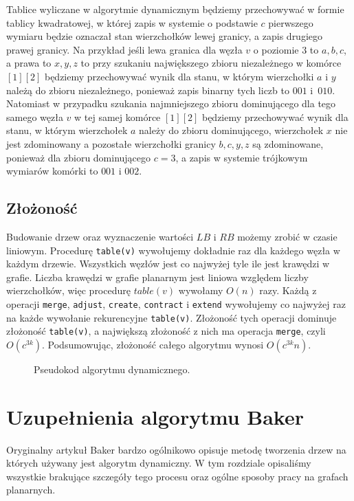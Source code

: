 \documentclass[twoside,a4paper,12pt]{report} %
\theoremstyle{break}
\begin{document}
Tablice wyliczane w algorytmie dynamicznym będziemy przechowywać w formie tablicy kwadratowej, w której zapis w systemie o podstawie $c$ pierwszego wymiaru będzie oznaczał stan wierzchołków lewej granicy, a zapis drugiego prawej granicy. Na przykład jeśli lewa granica dla węzła $v$ o poziomie $3$ to $a,b,c$, a prawa to $x,y,z$ to przy szukaniu największego zbioru niezależnego w komórce $[1][2]$ będziemy przechowywać wynik dla stanu, w którym wierzchołki $a$ i $y$ należą do zbioru niezależnego, ponieważ zapis binarny tych liczb to $001$ i~$010$. Natomiast w przypadku szukania najmniejszego zbioru dominującego dla tego samego węzła $v$ w tej samej komórce $[1][2]$ będziemy przechowywać wynik dla stanu, w którym wierzchołek $a$ należy do zbioru dominującego, wierzchołek $x$ nie jest zdominowany a pozostałe wierzchołki granicy $b,c,y,z$ są zdominowane, ponieważ dla zbioru dominującego $c=3$, a zapis w systemie trójkowym wymiarów komórki to $001$ i $002$.

\section{Złożoność}
Budowanie drzew oraz wyznaczenie wartości $LB$ i $RB$ możemy zrobić w czasie liniowym. Procedurę \texttt{table(v)} wywołujemy dokładnie raz dla każdego węzła w każdym drzewie. Wszystkich węzłów jest co najwyżej tyle ile jest krawędzi w grafie. Liczba krawędzi w grafie planarnym jest liniowa względem liczby wierzchołków, więc procedurę $table(v)$ wywołamy $O(n)$ razy. Każdą z operacji \texttt{merge}, \texttt{adjust}, \texttt{create}, \texttt{contract} i \texttt{extend} wywołujemy co najwyżej raz na każde wywołanie rekurencyjne \texttt{table(v)}. Złożoność tych operacji dominuje złożoność \texttt{table(v)}, a największą złożoność z nich ma operacja \texttt{merge}, czyli $O(c^{3k})$. Podsumowując, złożoność całego algorytmu wynosi $O(c^{3k}n)$.

\begin{figure}[ht]
    \centering
    
    \caption{Pseudokod algorytmu dynamicznego.}
    \label{pseudokod}
\end{figure}

\chapter{Uzupełnienia algorytmu Baker} \label{rozdzial_4}
Oryginalny artykuł Baker bardzo ogólnikowo opisuje metodę tworzenia drzew na których używany jest algorytm dynamiczny. W tym rozdziale opisaliśmy wszystkie brakujące szczegóły tego procesu oraz ogólne sposoby pracy na grafach planarnych. 
\end{document}
